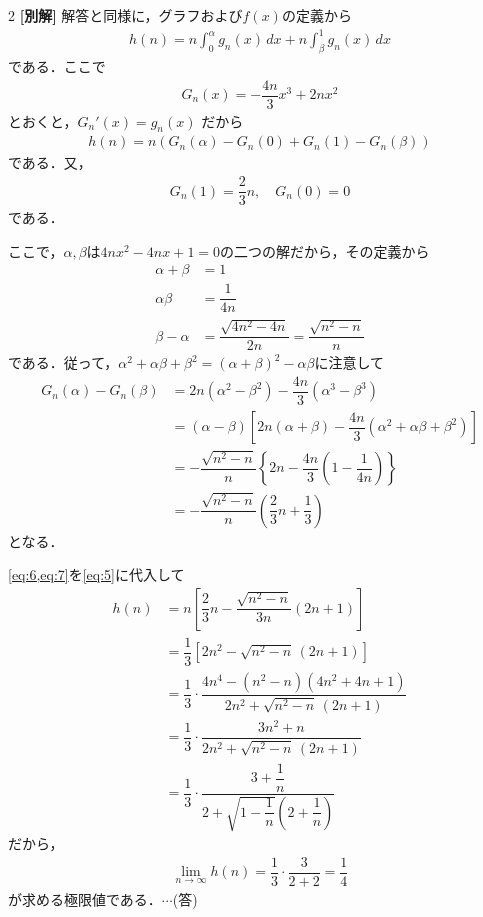 \documentclass[../../main.tex]{subfiles}
\begin{document}
\begin{multicols}{2}
  {\bf [別解]}
  解答と同様に，グラフおよび$f(x)$の定義から
  \begin{align}
    h(n) = n \int_0^\alpha g_n(x) \, dx + n \int_\beta^1 g_n(x) \, dx
  \end{align}
  である．ここで
  \begin{align}
    G_n(x) = -\dfrac{4n}{3}x^3 + 2nx^2
  \end{align}
  とおくと，$G_n'(x) = g_n(x)$ だから
  \begin{align}
    h(n) = n\left(G_n(\alpha) - G_n(0) + G_n(1) - G_n(\beta)\right) \label{eq:5}
  \end{align}
  である．又，
  \begin{align}
    G_n(1) = \dfrac{2}{3}n, \quad G_n(0) = 0 \label{eq:6}
  \end{align}
  である．

  ここで，$\alpha,\beta$は$4nx^2-4nx+1=0$の二つの解だから，その定義から
  \begin{align}
    \alpha+\beta     & = 1                                                    \\
    \alpha\beta      & = \dfrac{1}{4n}                                        \\
    \beta - \alpha   & = \dfrac{\sqrt{4n^2-4n}}{2n} = \dfrac{\sqrt{n^2-n}}{n}
  \end{align}
  である．従って，$\alpha^2+\alpha\beta+\beta^2 = (\alpha+\beta)^2-\alpha\beta$に注意して
  \begin{align}
    G_n(\alpha) - G_n(\beta)
    & = 2n(\alpha^2-\beta^2) - \dfrac{4n}{3}(\alpha^3-\beta^3)                                        \\
    & = (\alpha-\beta)\left[ 2n(\alpha+\beta) - \dfrac{4n}{3}(\alpha^2+\alpha\beta+\beta^2) \right] \\
    & = -\dfrac{\sqrt{n^2-n}}{n}\left\{ 2n - \dfrac{4n}{3}\left(1-\dfrac{1}{4n}\right) \right\}      \\
    & = -\dfrac{\sqrt{n^2-n}}{n}\left( \dfrac{2}{3}n + \dfrac{1}{3} \right) \label{eq:7}
  \end{align}
  となる．

  \cref{eq:6,eq:7}を\cref{eq:5}に代入して
  \begin{align}
    h(n)
    & = n\left[ \dfrac{2}{3}n - \dfrac{\sqrt{n^2-n}}{3n}(2n+1) \right]                        \\
    & = \dfrac{1}{3}\left[ 2n^2 - \sqrt{n^2-n}\,(2n+1) \right]                                \\
    & = \dfrac{1}{3} \cdot \dfrac{4n^4 - (n^2-n)(4n^2+4n+1)}{2n^2 + \sqrt{n^2-n}\,(2n+1)} \\
    & = \dfrac{1}{3} \cdot \dfrac{3n^2+n}{2n^2 + \sqrt{n^2-n}\,(2n+1)}                    \\
    & = \dfrac{1}{3} \cdot \dfrac{3+\dfrac{1}{n}}{2 + \sqrt{1-\dfrac{1}{n}}\left(2+\dfrac{1}{n}\right)}
  \end{align}
  だから，
  \begin{align}
    \lim_{n\to\infty} h(n) = \dfrac{1}{3} \cdot \dfrac{3}{2+2} = \dfrac{1}{4}
  \end{align}
  が求める極限値である．$\cdots$(答)


\end{multicols}
\end{document}
